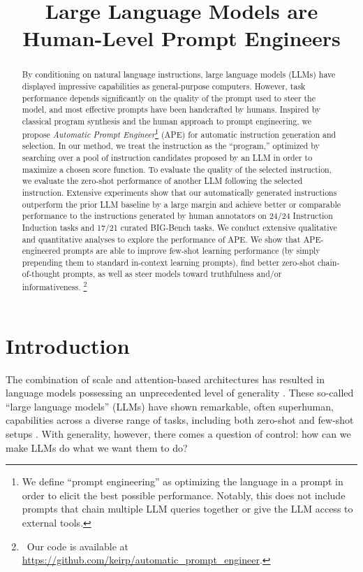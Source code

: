 \title{Large Language Models are Human-Level Prompt Engineers}



\maketitle
\renewcommand*{\thefootnote}{\arabic{footnote}}
\setcounter{footnote}{0}

\begin{abstract}
By conditioning on natural language instructions, large language models (LLMs) have displayed impressive capabilities as general-purpose computers. However, task performance depends significantly on the quality of the prompt used to steer the model, and most effective prompts have been handcrafted by humans. Inspired by classical program synthesis and the human approach to prompt engineering, we propose \textit{Automatic Prompt Engineer}\footnote{We define ``prompt engineering'' as optimizing the language in a prompt in order to elicit the best possible performance. Notably, this does not include prompts that chain multiple LLM queries together or give the LLM access to external tools.} (APE) for automatic instruction generation and selection. In our method, we treat the instruction as the ``program,'' optimized by searching over a pool of instruction candidates proposed by an LLM in order to maximize a chosen score function. To evaluate the quality of the selected instruction, we evaluate the zero-shot performance of another LLM following the selected instruction. Extensive experiments show that our automatically generated instructions outperform the prior LLM baseline by a large margin and achieve better or comparable performance to the instructions generated by human annotators on 24/24 Instruction Induction tasks and 17/21 curated BIG-Bench tasks. We conduct extensive qualitative and quantitative analyses to explore the performance of APE. We show that APE-engineered prompts are able to improve few-shot learning performance (by simply prepending them to standard in-context learning prompts), find better zero-shot chain-of-thought prompts, as well as steer models toward truthfulness and/or informativeness. 
\footnote{\ Our code is available at \url{https://github.com/keirp/automatic_prompt_engineer}.}
\end{abstract}

\section{Introduction}\label{sec:intro}
The combination of scale and attention-based architectures has resulted in language models possessing an unprecedented level of generality \citep{kaplan2020scaling,vaswani2017attention}. These so-called ``large language models'' (LLMs) have shown remarkable, often superhuman, capabilities across a diverse range of tasks, including both zero-shot and few-shot setups \citep{brown2020language,srivastava2022beyond}. With generality, however, there comes a question of control: how can we make LLMs do what we want them to do? 

